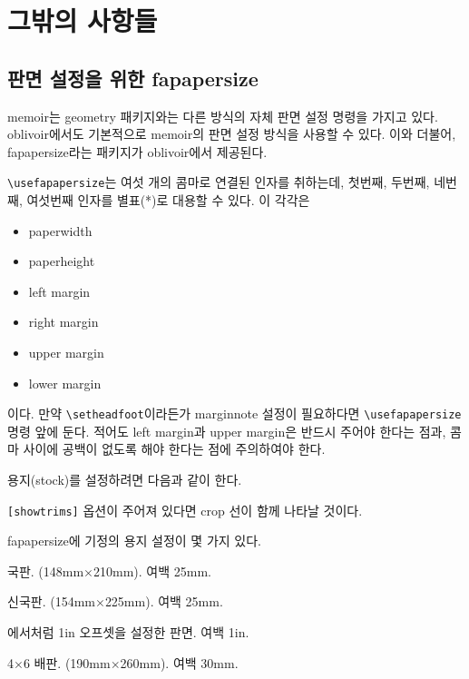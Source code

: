 \documentclass[
	12pt,
	a4paper,
	kosection,
	footnote,
	nobookmarks,
	microtype,
]{oblivoir}
\def\cs#1{\texttt{\textbackslash #1}}
\begin{document}
\section{그밖의 사항들}

\subsection{판면 설정을 위한 fapapersize}

memoir는 geometry 패키지와는 다른 방식의 자체 판면 설정 명령을 가지고 있다.
oblivoir에서도 기본적으로 memoir의 판면 설정 방식을 사용할 수 있다.
이와 더불어, \textsf{fapapersize}라는 패키지가
oblivoir에서 제공된다.

\begin{boxedverbatim}
\usepackage{fapapersize}
\usefapapersize{*,*,1in,*,1in,*}
\end{boxedverbatim}

\cs{usefapapersize}는 여섯 개의 콤마로 연결된 인자를 취하는데, 첫번째, 두번째, 네번째, 여섯번째 인자를 별표(*)로 대용할 수 있다. 이 각각은 
\begin{itemize}\tightlist
\item paperwidth
\item paperheight
\item left margin
\item right margin
\item upper margin
\item lower margin
\end{itemize}
이다. 만약 \cs{setheadfoot}이라든가 marginnote 설정이 필요하다면 \cs{usefapapersize} 명령 앞에 둔다.
적어도 left margin과 upper margin은 반드시 주어야 한다는 점과, 콤마 사이에 공백이 없도록 해야 한다는 점에 주의하여야 한다.

용지(stock)를 설정하려면 다음과 같이 한다.
\begin{boxedverbatim}
\usepackage[stock]{fapapersize}
\usefastocksize{210mm,297mm}
\usefapapersize{190mm,260mm,1in,*,1in,*}
\end{boxedverbatim}
\texttt{[showtrims]} 옵션이 주어져 있다면 crop 선이 함께 나타날 것이다.

\textsf{fapapersize}에 기정의 용지 설정이 몇 가지 있다.
\begin{description} \tightlist
\item [mum] 국판. (148mm$\times$210mm). 여백 25mm.
\item [newmum] 신국판. (154mm$\times$225mm). 여백 25mm.
\item [1in] 에서처럼 1in 오프셋을 설정한 판면. 여백 1in.
\item [dbl4x6] 4$\times$6 배판. (190mm$\times$260mm). 여백 30mm.
\end{description}
\end{document}
